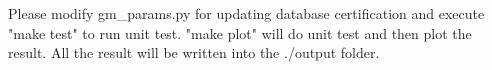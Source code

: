 Please modify gm\_params.py for updating database certification and execute "make test" to run unit test.
"make plot" will do unit test and then plot the result.
All the result will be written into the ./output folder.
